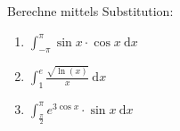 \documentclass[11pt, a4paper]{article}
\newcommand\brackets[1]{\left[#1\right]}
\newcommand{\intend}[1][]{\ \mathrm{d}#1}
\newif\ifshowsolution
\begin{document}
Berechne mittels Substitution:
\begin{enumerate}
	\item $\int_{-\pi}^\pi \sin{x} \cdot \cos{x} \intend{x}$
	
	\ifshowsolution
		\begin{align*}
			\shortintertext{Substituiere: $\sin{x} = t$}
			\shortintertext{$\frac{dt}{dx} = \cos{x} \Leftrightarrow \intend{x} = \frac{\intend{t}}{\cos{x}}$}
			\int_{-\pi}^\pi \sin{x} \cdot \cos{x} \intend{x} &= \int_{\sin{-\pi}}^{\sin{\pi}} t\ \cancel{\cos{x}}\ \frac{\intend{t}}{\cancel{\cos{x}}} \\
			&= \int_{\sin{-\pi}}^{\sin{\pi}} t \intend{t} \\
			&= \brackets{\frac{1}{2} t^2}_{\sin{-\pi}}^{\sin{\pi}} \\
			&= \frac{1}{2} \brackets{t^2}_0^0 \\
			&= 0
		\end{align*}
	\fi
	
	\item $\int_1^e \frac{\sqrt{\ln(x)}}{x} \intend{x}$
	
	\ifshowsolution
		\begin{align*}
			\shortintertext{Substituiere: $\ln(x) = t$}
			\shortintertext{$\frac{\intend{t}}{\intend{x}} = \frac{1}{x} \Leftrightarrow \intend{x} = x \intend{t}$}
			\int_1^e \frac{\sqrt{\ln(x)}}{x} dx &= \int_{\ln(1)}^{\ln(e)} \sqrt{z} \intend{t} \\
			&= \int_0^1 \sqrt{z} \intend{t} \\
			&= \brackets{ \frac{2}{3} z^{\frac{3}{2}} }_0^1 \\
			&= \frac{2}{3}
			\shortintertext{Oder: Rücksubstitution nach Integration}
			\brackets{ \frac{2}{3} z^{\frac{3}{2}} }_0^1 &= \brackets{ \frac{2}{3} \ln(x)^{\frac{3}{2}} }_1^e \\
			&= \frac{2}{3}
		\end{align*}
	\fi
	
	\item $\int_\frac{\pi}{2}^\pi e^{3 \cos x} \cdot \sin x \intend{x}$
	

\end{enumerate}
\end{document}
